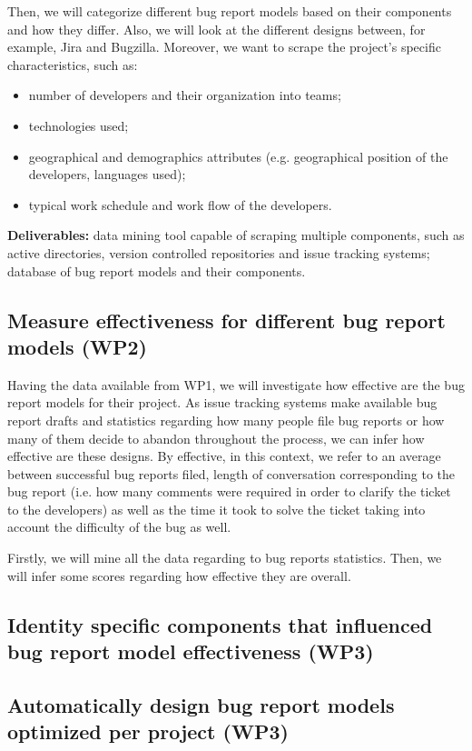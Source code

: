 \documentclass[11pt,english,twocolumn]{article}
\begin{document}
Then, we will categorize different bug report models based on their components and how
they differ. Also, we will look at the different designs between, for example, Jira and Bugzilla.
Moreover, we want to scrape the project's specific characteristics, such as:
	\begin{itemize}
		\item number of developers and their organization into teams;
		\item technologies used;
		\item geographical and demographics attributes (e.g. geographical position of the 
		developers, languages used);
		\item typical work schedule and work flow of the developers.
	\end{itemize}
\textbf{Deliverables:} data mining tool capable of scraping multiple components, such as 
active directories, version controlled repositories and issue tracking systems; database of
bug report models and their components.

\subsection*{Measure effectiveness for different bug report models (WP2)}

Having the data available from WP1, we will investigate how effective are the bug report
models for their project. As issue tracking systems make available bug report drafts and 
statistics regarding how many people file bug reports or how many of them decide to abandon
throughout the process, we can infer how effective are these designs. By effective, in this
context, we refer to an average between successful bug reports filed, length of conversation 
corresponding to the bug report (i.e. how many comments were required in order to clarify 
the ticket to the developers) as well as the time it took to solve the ticket taking into 
account the difficulty of the bug as well.

Firstly, we will mine all the data regarding to bug reports statistics. Then, we will infer
some scores regarding how effective they are overall. 

\subsection*{Identity specific components that influenced bug report model effectiveness (WP3)}

\subsection*{Automatically design bug report models optimized per project (WP3)}
\end{document}

